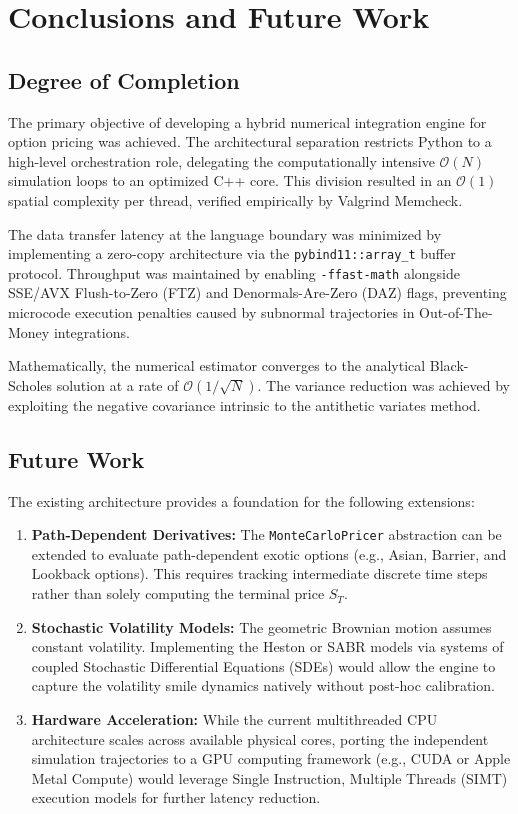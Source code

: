 \chapter{Conclusions and Future Work}

\section{Degree of Completion}
The primary objective of developing a hybrid numerical integration engine for option pricing was achieved. The architectural separation restricts Python to a high-level orchestration role, delegating the computationally intensive $\mathcal{O}(N)$ simulation loops to an optimized C++ core. This division resulted in an $\mathcal{O}(1)$ spatial complexity per thread, verified empirically by Valgrind Memcheck. 

The data transfer latency at the language boundary was minimized by implementing a zero-copy architecture via the \texttt{pybind11::array\_t} buffer protocol. Throughput was maintained by enabling \texttt{-ffast-math} alongside SSE/AVX Flush-to-Zero (FTZ) and Denormals-Are-Zero (DAZ) flags, preventing microcode execution penalties caused by subnormal trajectories in Out-of-The-Money integrations.

Mathematically, the numerical estimator converges to the analytical Black-Scholes solution at a rate of $\mathcal{O}(1/\sqrt{N})$. The variance reduction was achieved by exploiting the negative covariance intrinsic to the antithetic variates method. 

\section{Future Work}
The existing architecture provides a foundation for the following extensions:

\begin{enumerate}
    \item \textbf{Path-Dependent Derivatives:} The \texttt{MonteCarloPricer} abstraction can be extended to evaluate path-dependent exotic options (e.g., Asian, Barrier, and Lookback options). This requires tracking intermediate discrete time steps rather than solely computing the terminal price \(S_T\).
    \item \textbf{Stochastic Volatility Models:} The geometric Brownian motion assumes constant volatility. Implementing the Heston or SABR models via systems of coupled Stochastic Differential Equations (SDEs) would allow the engine to capture the volatility smile dynamics natively without post-hoc calibration.
    \item \textbf{Hardware Acceleration:} While the current multithreaded CPU architecture scales across available physical cores, porting the independent simulation trajectories to a GPU computing framework (e.g., CUDA or Apple Metal Compute) would leverage Single Instruction, Multiple Threads (SIMT) execution models for further latency reduction.
\end{enumerate}
